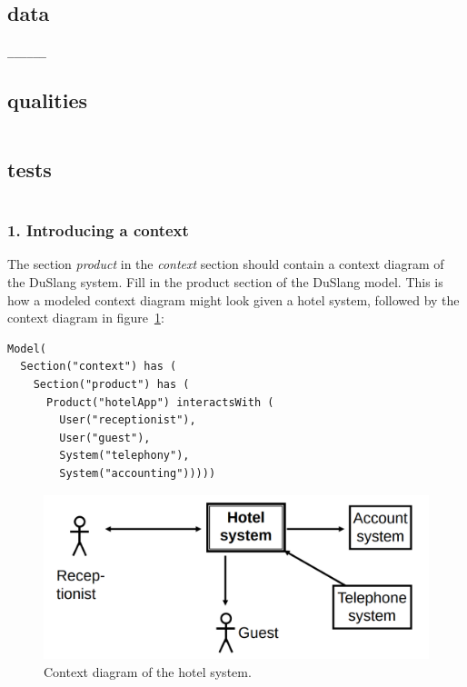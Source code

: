 \documentclass[11pt]{article}
\begin{document}
\begin{framed}
       \subsection*{data}
\begin{lstlisting}
______
\end{lstlisting}
       \subsection*{qualities}
\begin{lstlisting}
\end{lstlisting}
       \subsection*{tests}
\begin{lstlisting}
\end{lstlisting}
\end{framed}
%
%

\subsubsection*{1. Introducing a context}
The section \textit{product} in the \textit{context} section should contain a context diagram of the DuSlang system. Fill in the product section of the DuSlang model. This is how a modeled context diagram might look given a hotel system, followed by the context diagram in figure~\ref{figure:hotelSystem}:

{\footnotesize\begin{verbatim}
Model(
  Section("context") has (
    Section("product") has (
      Product("hotelApp") interactsWith (
        User("receptionist"), 
        User("guest"), 
        System("telephony"), 
        System("accounting")))))
\end{verbatim}}

\begin{figure}[H]
  \centering
  \includegraphics[width=\textwidth]{context-diagram-hotel-system.png}
  \caption{Context diagram of the hotel system.}
  \label{figure:hotelSystem}
\end{figure}
\end{document}
